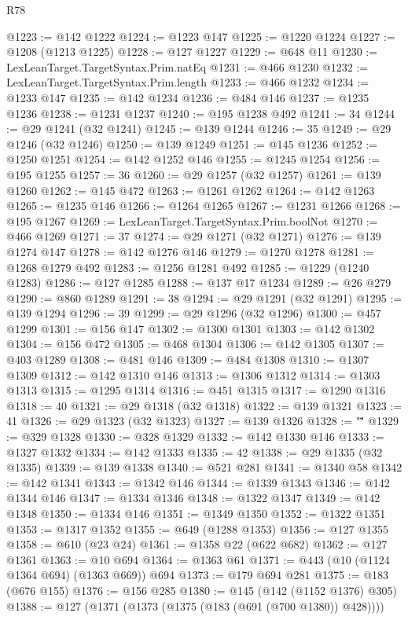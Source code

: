 \begin{lexlean}{R78}
\begin{coremodule}
@1223 := @142 @1222
@1224 := @1223 @147
@1225 := @1220 @1224
@1227 := @1208 (@1213 @1225)
@1228 := @127 @1227
@1229 := @648 @11
@1230 := LexLeanTarget.TargetSyntax.Prim.natEq
@1231 := @466 @1230
@1232 := LexLeanTarget.TargetSyntax.Prim.length
@1233 := @466 @1232
@1234 := @1233 @147
@1235 := @142 @1234
@1236 := @484 @146
@1237 := @1235 @1236
@1238 := @1231 @1237
@1240 := @195 @1238 @492
@1241 := 34
@1244 := @29 @1241 (@32 @1241)
@1245 := @139 @1244
@1246 := 35
@1249 := @29 @1246 (@32 @1246)
@1250 := @139 @1249
@1251 := @145 @1236
@1252 := @1250 @1251
@1254 := @142 @1252 @146
@1255 := @1245 @1254
@1256 := @195 @1255
@1257 := 36
@1260 := @29 @1257 (@32 @1257)
@1261 := @139 @1260
@1262 := @145 @472
@1263 := @1261 @1262
@1264 := @142 @1263
@1265 := @1235 @146
@1266 := @1264 @1265
@1267 := @1231 @1266
@1268 := @195 @1267
@1269 := LexLeanTarget.TargetSyntax.Prim.boolNot
@1270 := @466 @1269
@1271 := 37
@1274 := @29 @1271 (@32 @1271)
@1276 := @139 @1274 @147
@1278 := @142 @1276 @146
@1279 := @1270 @1278
@1281 := @1268 @1279 @492
@1283 := @1256 @1281 @492
@1285 := @1229 (@1240 @1283)
@1286 := @127 @1285
@1288 := @137 @17 @1234
@1289 := @26 @279
@1290 := @860 @1289
@1291 := 38
@1294 := @29 @1291 (@32 @1291)
@1295 := @139 @1294
@1296 := 39
@1299 := @29 @1296 (@32 @1296)
@1300 := @457 @1299
@1301 := @156 @147
@1302 := @1300 @1301
@1303 := @142 @1302
@1304 := @156 @472
@1305 := @468 @1304
@1306 := @142 @1305
@1307 := @403 @1289
@1308 := @481 @146
@1309 := @484 @1308
@1310 := @1307 @1309
@1312 := @142 @1310 @146
@1313 := @1306 @1312
@1314 := @1303 @1313
@1315 := @1295 @1314
@1316 := @451 @1315
@1317 := @1290 @1316
@1318 := 40
@1321 := @29 @1318 (@32 @1318)
@1322 := @139 @1321
@1323 := 41
@1326 := @29 @1323 (@32 @1323)
@1327 := @139 @1326
@1328 := "\""
@1329 := @329 @1328
@1330 := @328 @1329
@1332 := @142 @1330 @146
@1333 := @1327 @1332
@1334 := @142 @1333
@1335 := 42
@1338 := @29 @1335 (@32 @1335)
@1339 := @139 @1338
@1340 := @521 @281
@1341 := @1340 @58
@1342 := @142 @1341
@1343 := @1342 @146
@1344 := @1339 @1343
@1346 := @142 @1344 @146
@1347 := @1334 @1346
@1348 := @1322 @1347
@1349 := @142 @1348
@1350 := @1334 @146
@1351 := @1349 @1350
@1352 := @1322 @1351
@1353 := @1317 @1352
@1355 := @649 (@1288 @1353)
@1356 := @127 @1355
@1358 := @610 (@23 @24)
@1361 := @1358 @22 (@622 @682)
@1362 := @127 @1361
@1363 := @10 @694
@1364 := @1363 @61
@1371 := @443 (@10 (@1124 @1364 @694) (@1363 @669)) @694
@1373 := @179 @694 @281
@1375 := @183 (@676 @155)
@1376 := @156 @285
@1380 := @145 (@142 (@1152 @1376) @305)
@1388 := @127 (@1371 (@1373 (@1375 (@183 (@691 (@700 @1380)) @428))))

\end{coremodule}
\end{lexlean}
